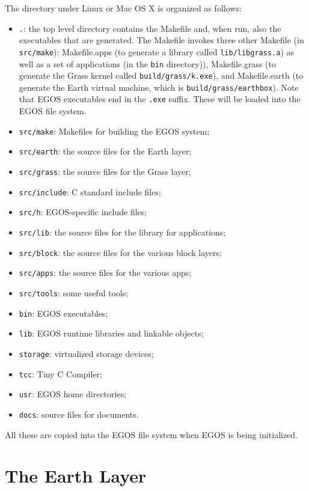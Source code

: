 \documentclass{article}
\begin{document}
The directory under Linux or Mac OS X is organized as follows:
\begin{itemize}
\item \texttt{.}: the top level directory contains the Makefile and,
when run, also the executables that are generated.  The Makefile invokes
three other Makefile (in \texttt{src/make}):
Makefile.apps (to generate a library called \texttt{lib/libgrass.a})
as well as a set of applications (in the \texttt{bin} directory)),
Makefile.grass (to generate the Grass kernel called \texttt{build/grass/k.exe}),
and Makefile.earth (to generate the Earth virtual
machine, which is \texttt{build/grass/earthbox}).
Note that EGOS executables end in the \texttt{.exe} suffix.  These will
be loaded into the EGOS file system.
\item \texttt{src/make}: Makefiles for building the EGOS system;
\item \texttt{src/earth}: the source files for the Earth layer;
\item \texttt{src/grass}: the source files for the Grass layer;
\item \texttt{src/include}: C standard include files;
\item \texttt{src/h}: EGOS-specific include files;
\item \texttt{src/lib}: the source files for the library for applications;
\item \texttt{src/block}: the source files for the various block layers;
\item \texttt{src/apps}: the source files for the various apps;
\item \texttt{src/tools}: some useful tools;
\item \texttt{bin}: EGOS executables;
\item \texttt{lib}: EGOS runtime libraries and linkable objects;
\item \texttt{storage}: virtualized storage devices;
\item \texttt{tcc}: Tiny C Compiler;
\item \texttt{usr}: EGOS home directories;
\item \texttt{docs}: source files for documents.
\end{itemize}

All these are copied into the EGOS file system when EGOS is being initialized.

\section{The Earth Layer}
\end{document}
